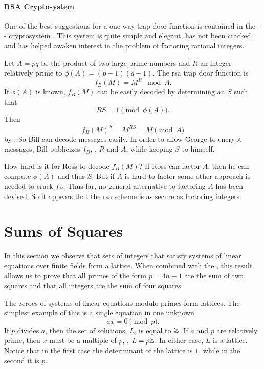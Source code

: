 \paragraph{RSA Cryptosystem}


One of the best suggestions for a one way trap door function is
contained in the {\Rivest}-{\Shamir}-{\Adleman} cryptosystem
\cite{Rivest78}.  This system is quite simple and elegant, has not
been cracked and has helped awaken interest in the problem of
factoring rational integers.

Let $A = pq$ be the product of two large prime numbers and $R$ an
integer relatively prime to $\phi(A) = (p-1)(q-1)$.  The {\sc rsa} trap door
function is
\[
f_B(M) = M^R \mod A.
\]
If $\phi(A)$ is known, $f_B(M)$ can be easily decoded by determining
an $S$ such that
\[
RS = 1 \pmod{\phi(A)}.
\]
Then
\[
f_B(M)^S = M^{RS} = M \pmod{A}
\]
by .  So Bill can decode messages easily.
In order to allow George to encrypt messages, Bill publicizes $f_B$,
\ie, $R$ and $A$, while keeping $S$ to himself.  

How hard is it for Ross to decode $f_B(M)$?  If Ross can factor $A$,
then he can compute $\phi(A)$ and thus $S$.  But if $A$ is hard to
factor some other approach is needed to crack $f_B$.  Thus far, no
general alternative to factoring $A$ has been devised.  So it appears
that the {\sc rsa} scheme is as secure as factoring integers.  


\section{Sums of Squares}
\label{FF:SumSquares:Sec}

In this section
 we observe that sets of integers that satisfy systems
of linear equations over finite fields form a lattice.  When combined
with the , this result allows us to prove
that all primes of the form $p= 4n+1$ are the sum of two squares and
that all integers are the sum of four squares.

The zeroes of systems of linear equations modulo primes form lattices.
The simplest example of this is a single equation in one unknown
\[
ax = 0 \pmod{p}.
\]
If $p$ divides $a$, then the set of solutions, $L$, is equal to $\mathbb{Z}$.  If $a$ and $p$ are relatively
prime, then $x$ must be a multiple of $p$, \ie, $L = p\mathbb{Z}$.  In either
case, $L$ is a lattice.  Notice that in the first case the determinant
of the lattice is $1$, while in the second it is $p$.  

